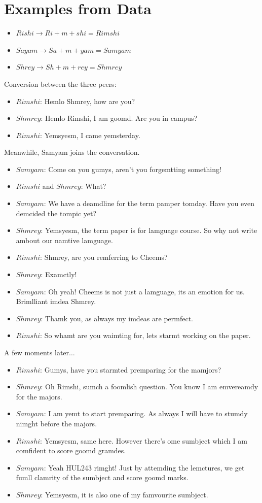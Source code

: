 \documentclass{article}
\begin{document}
\section{Examples from Data}
\begin{itemize}
    \item $Rishi \rightarrow Ri+m+shi = Rimshi$
    \item $Sayam \rightarrow Sa+m+yam = Samyam$
    \item $Shrey \rightarrow Sh+m+rey = Shmrey$
\end{itemize}
Conversion between the three peers:
\begin{itemize}[label={}]
    \item $Rimshi$: Hemlo Shmrey, how are you?
    \item $Shmrey$: Hemlo Rimshi, I am goomd. Are you in campus?
    \item $Rimshi$: Yemsyesm, I came yemsterday.
\end{itemize}
Meanwhile, Samyam joins the conversation.
\begin{itemize}[label={}]
    \item $Samyam$: Come on you gumys, aren't you forgemtting something!
    \item $Rimshi$ and $Shmrey$: What?
    \item $Samyam$: We have a deamdline for the term pamper tomday. Have you even demcided the tompic yet?
    \item $Shmrey$: Yemsyesm, the term paper is for lamguage course. So why not write ambout our namtive lamguage.
    \item $Rimshi$: Shmrey, are you remferring to Cheems?
    \item $Shmrey$: Examctly!
    \item $Samyam$: Oh yeah! Cheems is not just a lamguage, its an emotion for us. Brimlliant imdea Shmrey.
    \item $Shmrey$: Thamk you, as always my imdeas are permfect.
    \item $Rimshi$: So whamt are you waimting for, lets starmt working on the paper.
\end{itemize}
A few moments later$\ldots$
\begin{itemize}[label={}]
    \item $Rimshi$: Gumys, have you starmted premparing for the mamjors?
    \item $Shmrey$: Oh Rimshi, sumch a foomlish question. You know I am emvereamdy for the majors.
    \item $Samyam$: I am yemt to start premparing. As always I will have to stumdy nimght before the majors.
    \item $Rimshi$: Yemsyesm, same here. However there's ome sumbject which I am comfident to score goomd gramdes.
    \item $Samyam$: Yeah HUL243 rimght! Just by attemding the lemctures, we get fumll clamrity of the sumbject and score goomd marks.
    \item $Shmrey$: Yemsyesm, it is also one of my famvourite sumbject.
\end{itemize}
\end{document}
